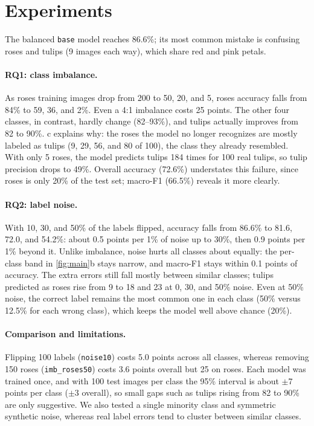 \section{Experiments}
\label{sec:experiments}



The balanced \texttt{base} model reaches 86.6\%; its most common mistake is confusing roses and tulips
(9 images each way), which share red and pink petals.

\paragraph{RQ1: class imbalance.}
As roses training images drop from 200 to 50, 20, and 5, roses accuracy falls from 84\% to 59, 36, and 2\%.
Even a 4:1 imbalance costs 25 points.
The other four classes, in contrast, hardly change (82--93\%), and tulips actually improves from 82 to 90\%.
c explains why: the roses the model no longer recognizes are mostly labeled as tulips
(9, 29, 56, and 80 of 100), the class they already resembled.
With only 5 roses, the model predicts tulips 184 times for 100 real tulips, so tulip precision drops to 49\%.
Overall accuracy (72.6\%) understates this failure, since roses is only 20\% of the test set;
macro-F1 (66.5\%) reveals it more clearly.

\paragraph{RQ2: label noise.}
With 10, 30, and 50\% of the labels flipped, accuracy falls from 86.6\% to 81.6, 72.0, and 54.2\%:
about 0.5 points per 1\% of noise up to 30\%, then 0.9 points per 1\% beyond it.
Unlike imbalance, noise hurts all classes about equally: the per-class band in \cref{fig:main}b stays narrow,
and macro-F1 stays within 0.1 points of accuracy.
The extra errors still fall mostly between similar classes; tulips predicted as roses rise from 9 to 18 and 23
at 0, 30, and 50\% noise.
Even at 50\% noise, the correct label remains the most common one in each class (50\% versus 12.5\% for each
wrong class), which keeps the model well above chance (20\%).

\paragraph{Comparison and limitations.}
Flipping 100 labels (\texttt{noise10}) costs 5.0 points across all classes, whereas removing 150 roses
(\texttt{imb\_roses50}) costs 3.6 points overall but 25 on roses.
Each model was trained once, and with 100 test images per class the 95\% interval is about $\pm$7 points per class
($\pm$3 overall), so small gaps such as tulips rising from 82 to 90\% are only suggestive.
We also tested a single minority class and symmetric synthetic noise, whereas real label errors tend to cluster
between similar classes.
